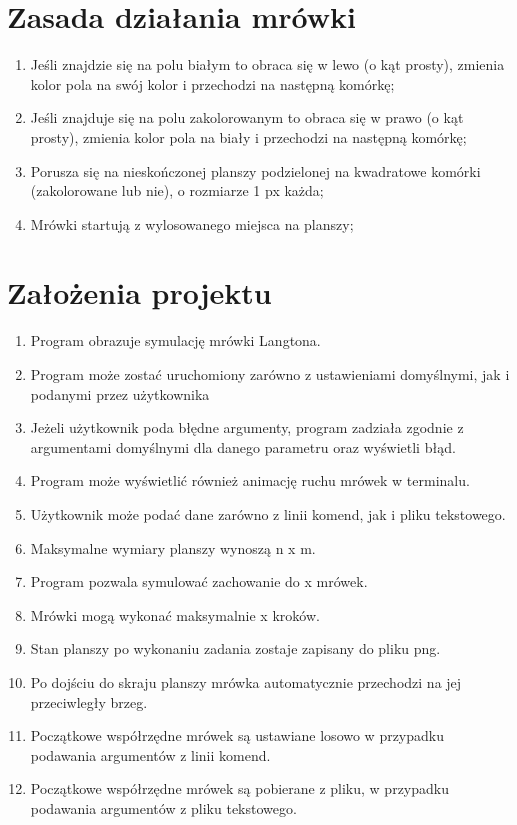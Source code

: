 \documentclass[a4paper,12pt]{article}
\begin{document}
\section{Zasada działania mrówki}
\begin{enumerate}
\item Jeśli znajdzie się na polu białym to obraca się w lewo (o kąt prosty), zmienia kolor pola na swój kolor i przechodzi na następną komórkę;
\item Jeśli znajduje się na polu zakolorowanym to obraca się w prawo (o kąt prosty), zmienia kolor pola na biały i przechodzi na następną komórkę;
\item Porusza się na nieskończonej planszy podzielonej na kwadratowe komórki (zakolorowane lub nie), o rozmiarze 1 px każda;
\item Mrówki startują z wylosowanego miejsca na planszy;
\end{enumerate}
\section{Założenia projektu}
\begin{enumerate}
\item Program obrazuje symulację mrówki Langtona.
\item Program może zostać uruchomiony zarówno z ustawieniami domyślnymi, jak i podanymi przez użytkownika
\item Jeżeli użytkownik poda błędne argumenty, program zadziała zgodnie z argumentami domyślnymi dla danego parametru oraz wyświetli błąd.
\item Program może wyświetlić również animację ruchu mrówek w terminalu.
\item Użytkownik może podać dane zarówno z linii komend, jak i pliku tekstowego.
\item Maksymalne wymiary planszy wynoszą n x m.
\item Program pozwala symulować zachowanie do x mrówek.
\item Mrówki mogą wykonać maksymalnie x kroków.
\item Stan planszy po wykonaniu zadania zostaje zapisany do pliku png.
\item Po dojściu do skraju planszy mrówka automatycznie przechodzi na jej przeciwległy brzeg.
\item Początkowe współrzędne mrówek są ustawiane losowo w przypadku podawania argumentów z linii komend.
\item Początkowe współrzędne mrówek są pobierane z pliku, w przypadku podawania argumentów z pliku tekstowego.
\end{enumerate}
\end{document}

